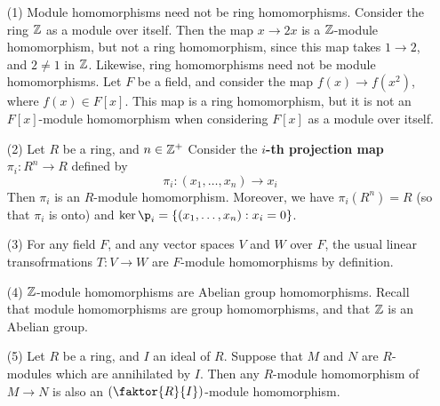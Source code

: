 \begin{example}\label{example_4.4}
    \begin{enumerate}
        \item[(1)] Module homomorphisms need not be ring homomorphisms. Consider
            the ring $\mathbb{Z}$ as a module over itself. Then the map  $x
            \xrightarrow{} 2x$ is a $\mathbb{Z}$-module homomorphism, but not a ring
            homomorphism, since this map takes  $1 \xrightarrow{} 2$, and $2
            \neq 1$ in  $\mathbb{Z}$. Likewise, ring homomorphisms need not be module
            homomorphisms. Let $F$ be a field, and consider the map $f(x)
            \xrightarrow{} f(x^2)$, where $f(x) \in F[x]$. This map is a ring
            homomorphism, but it is not an  $F[x]$-module homomorphism when
            considering $F[x]$ as a module over itself.

        \item[(2)] Let $R$ be a ring, and  $n \in \mathbb{Z}^+$ Consider the \textbf{$i$-th
            projection map} $\pi_i:R^n \xrightarrow{} R$ defined by
            \begin{equation*}
                \pi_i:(x_1, \dots, x_n) \xrightarrow{} x_i
            \end{equation*}
            Then $\pi_i$ is an $R$-module homomorphism. Moreover, we have
            $\pi_i(R^n)=R$ (so that $\pi_i$ is onto) and $\ker{\p_i}=\{(x_1,
            \dots, x_n) : x_i=0\}$.

            \item[(3)] For any field $F$, and any vector spaces $V$ and $W$ over
                 $F$, the usual linear transofrmations  $T:V \xrightarrow{} W$
                 are $F$-module homomorphisms by definition.

             \item[(4)] $\mathbb{Z}$-module homomorphisms are Abelian group
                 homomorphisms. Recall that  module homomorphisms are group
                 homomorphisms, and that $\mathbb{Z}$ is an Abelian group.

             \item[(5)] Let $R$ be a ring, and  $I$ an ideal of  $R$. Suppose
                 that  $M$ and  $N$ are  $R$-modules which are annihilated by
                 $I$. Then any $R$-module homomorphism of $M \xrightarrow{} N$
                 is also an $(\faktor{R}{I})$-module homomorphism.
    \end{enumerate}
\end{example}

